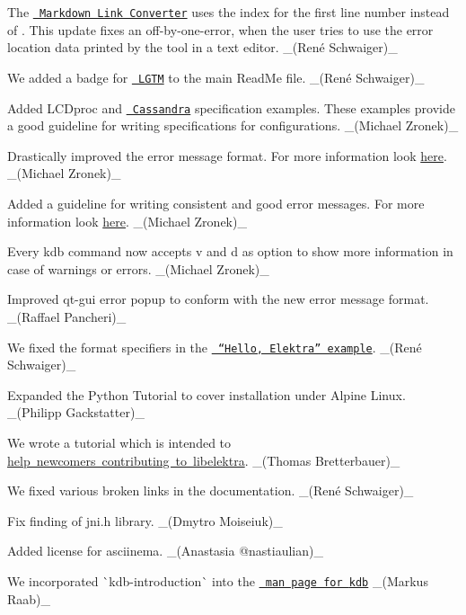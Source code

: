 \begin{DoxyItemize}
\item The \href{https://master.libelektra.org/doc/markdownlinkconverter}{\texttt{ Markdown Link Converter}} uses the index {} for the first line number instead of {}. This update fixes an off-\/by-\/one-\/error, when the user tries to use the error location data printed by the tool in a text editor. \+\_\+(René Schwaiger)\+\_\+
\item We added a badge for \href{https://lgtm.com}{\texttt{ L\+G\+TM}} to the main Read\+Me file. \+\_\+(René Schwaiger)\+\_\+
\item Added L\+C\+Dproc and \href{/home/mpranj/workspace/libelektra/examples/spec/cassandra.ini}{\texttt{ Cassandra}} specification examples. These examples provide a good guideline for writing specifications for configurations. \+\_\+(\+Michael Zronek)\+\_\+
\item Drastically improved the error message format. For more information look \mbox{\hyperlink{doc_decisions_error_message_format_md}{here}}. \+\_\+(\+Michael Zronek)\+\_\+
\item Added a guideline for writing consistent and good error messages. For more information look \mbox{\hyperlink{doc_dev_error-message_md}{here}}. \+\_\+(\+Michael Zronek)\+\_\+
\item Every {\ttfamily kdb} command now accepts {\ttfamily v} and {\ttfamily d} as option to show more information in case of warnings or errors. \+\_\+(\+Michael Zronek)\+\_\+
\item Improved qt-\/gui error popup to conform with the new error message format. \+\_\+(\+Raffael Pancheri)\+\_\+
\item We fixed the format specifiers in the \href{https://master.libelektra.org/examples/helloElektra.c}{\texttt{ “\+Hello, Elektra” example}}. \+\_\+(René Schwaiger)\+\_\+
\item Expanded the Python Tutorial to cover installation under Alpine Linux. \+\_\+(\+Philipp Gackstatter)\+\_\+
\item We wrote a tutorial which is intended to \mbox{\hyperlink{doc_tutorials_contributing-clion_md}{help newcomers contributing to libelektra}}. \+\_\+(\+Thomas Bretterbauer)\+\_\+
\item We fixed various broken links in the documentation. \+\_\+(René Schwaiger)\+\_\+
\item Fix finding of jni.\+h library. \+\_\+(\+Dmytro Moiseiuk)\+\_\+
\item Added license for asciinema. \+\_\+(Anastasia @nastiaulian)\+\_\+
\item We incorporated \`{}kdb-\/introduction\`{} into the \href{https://www.libelektra.org/manpages/kdb}{\texttt{ man page for {\ttfamily kdb}}} \+\_\+(\+Markus Raab)\+\_\+
\end{DoxyItemize}


